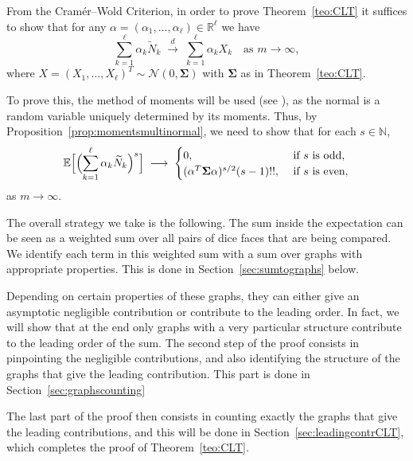 \documentclass[reqno,a4paper,11pt]{amsart}
\makeatletter
\theoremstyle{remark}
\newcommand{\mc}[1]{{\mathcal #1}}
\newcommand{\bb}[1]{{\mathbb #1}}
\numberwithin{equation}{section}
\renewenvironment{proof}[1][Proof]{\par
\pushQED{\qed}%
\normalfont \topsep6\p@\@plus6\p@\relax
\trivlist
\item\relax
{\itshape
#1\@addpunct{.}}\hspace\labelsep\ignorespaces
}{%
\popQED\endtrivlist\@endpefalse
}
\makeatother
\begin{document}

From the Cramér--Wold Criterion, in order to prove Theorem~\ref{teo:CLT} it suffices to show that for any
$\alpha = (\alpha_1, \ldots, \alpha_\ell) \in \bb R^\ell$ we have
%
\begin{equation*}
\sum_{k=1}^{\ell} \alpha_k \widetilde{N}_k
    \;\overset{d}{\longrightarrow}\; \sum_{k=1}^\ell \alpha_k X_k \quad \text{as } m\to \infty,
\end{equation*}
where $X = (X_1, \ldots, X_\ell)^T \sim \mc N(0, \bm \Sigma)$ with $\bm
\Sigma$ as in Theorem~\ref{teo:CLT}.

To prove this, the method of moments will be used (see \cite[Theorem 3.12, page
109]{Durrett}), as the normal is a random variable uniquely determined by its
moments.  Thus, by Proposition~\ref{prop:momentsmultinormal}, we need to show
that for each $s\in \bb N$,
\begin{equation}
\label{eq:s_moment_tildeN}
\mathbb E\Bigl[ \Bigl(\sum_{k=1}^{\ell}\alpha_k \widetilde{N}_k\Bigr)^{s}\Bigr]\;\longrightarrow\;
\begin{cases}
0, & \text{ if }s \text{ is odd}, \\
(\alpha^T \bm \Sigma \alpha)^{s/2} (s-1)!!, & \text{ if } s \text{ is even},
\end{cases}
\end{equation}
as $m \to \infty$. 

The overall strategy we take is the following. The sum inside the expectation can be seen as a weighted sum over all pairs of dice faces that are being compared. We identify each term in this weighted sum with a sum over graphs with appropriate properties. This is done in Section~\ref{sec:sumtographs} below. 

Depending on certain properties of these graphs, they can either give an asymptotic negligible contribution or contribute to the leading order. In fact, we will show that at the end only graphs with a very particular structure contribute to the leading order of the sum. The second step of the proof consists in pinpointing the negligible contributions, and also identifying the structure of the graphs that give the leading contribution. This part is done in Section~\ref{sec:graphscounting}

The last part of the proof then consists in counting exactly the graphs that give the leading contributions, and this will be done in Section~\ref{sec:leadingcontrCLT}, which completes the proof of Theorem~\ref{teo:CLT}.
\end{document}
